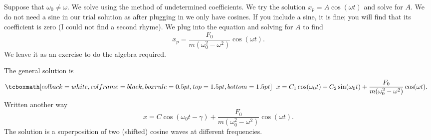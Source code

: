 Suppose that $\omega_0 \not= \omega$.
We solve using the method of undetermined coefficients.
We try the solution
$x_p = A \cos (\omega t)$ and solve for $A$.  We do not need a sine
in our trial solution as after plugging in we only have cosines.
If you include a sine, it is fine; you will find that its
coefficient is zero (I could not find a second rhyme).
We plug into the equation and solving for $A$ to find
\begin{equation*}
x_p = \frac{F_0}{m(\omega_0^2 - \omega^2)} \cos (\omega t) .
\end{equation*}
We leave it as an exercise to do the algebra required.

The general solution is
\begin{equation*}
\mybxbg{
~~
x = C_1 \cos (\omega_0 t) + C_2 \sin (\omega_0 t) +
\frac{F_0}{m(\omega_0^2 - \omega^2)} \cos (\omega t) .
~~
}
\end{equation*}
Written another way
\begin{equation*}
x = C \cos (\omega_0 t - \gamma) +
\frac{F_0}{m(\omega_0^2 - \omega^2)} \cos (\omega t) .
\end{equation*}
The solution is a superposition of two (shifted) cosine waves at different frequencies.
\pagebreak[2]

